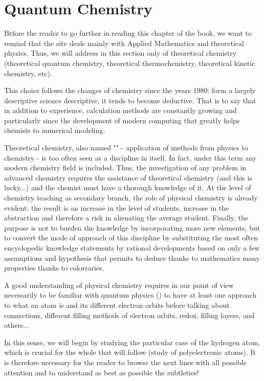 	\newpage
	\thispagestyle{empty}
	\mbox{}
	\section{Quantum Chemistry}
	\lettrine[lines=4]{\color{BrickRed}B}efore the reader to go further in reading this chapter of the book, we want to remind that the site deals mainly with Applied Mathematics and theoretical physics. Thus, we will address in this section only of theoretical chemistry (theoretical quantum  chemistry, theoretical thermochemistry, theoretical kinetic chemistry, etc).
	
	This choice follows the changes of chemistry since the years 1980: form a largely descriptive science descriptive, it tends to become deductive. That is to say that in addition to experience, calculation methods are constantly growing and particularly since the development of modern computing that greatly helps chemists to numerical modeling.	
	
	Theoretical chemistry, also named "" - application of methods from physics to chemistry - is too often seen as a discipline in itself. In fact, under this term any modern chemistry field is included. Thus, the investigation of any problem in advanced chemistry requires the assistance of theoretical chemistry (and this is lucky...) and the chemist must have a thorough knowledge of it. At the level of chemistry teaching as secondary branch, the role of physical chemistry is already evident: the result is an increase in the level of students, increase in the abstraction and therefore a risk in alienating the average student. Finally, the purpose is not to burden the knowledge by incorporating more new elements, but to convert the mode of approach of this discipline by substituting the most often encyclopedic knowledge statements by rational developments based on only a few assumptions and hypothesis that permits to deduce thanks to mathematics many properties thanks to colorraries.
	
	A good understanding of physical chemistry requires in our point of view necessarily to be familiar with quantum physics () to have at least one approach to what an atom is and its different electron orbits before talking about connections, different filling methods of electron orbits, redox, filling layers, and others...
	
	In this sense, we will begin by studying the particular case of the hydrogen atom, which is crucial for the whole that will follow (study of polyelectronic atoms). It is therefore necessary for the reader to browse the next lines with all possible attention and to understand as best as possible the subtleties!
	
